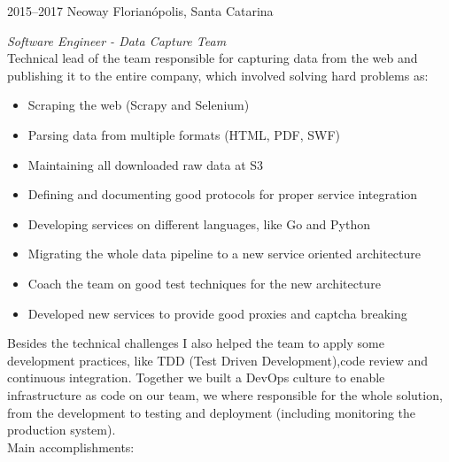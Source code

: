 \documentclass[]{friggeri-cv} %
\begin{document}
\begin{entrylist}
\entry
{2015--2017}
{Neoway}
{Florianópolis, Santa Catarina}
{\emph{Software Engineer - Data Capture Team} \\

    Technical lead of the team responsible for capturing data from the web and publishing it to the entire company,
which involved solving hard problems as:\\

\begin{itemize}
    \item Scraping the web (Scrapy and Selenium)
    \item Parsing data from multiple formats (HTML, PDF, SWF)
    \item Maintaining all downloaded raw data at S3
    \item Defining and documenting good protocols for proper service integration
    \item Developing services on different languages, like Go and Python
    \item Migrating the whole data pipeline to a new service oriented architecture
    \item Coach the team on good test techniques for the new architecture
    \item Developed new services to provide good proxies and captcha breaking
\end{itemize}

Besides the technical challenges I also helped the team to apply some
development practices, like TDD (Test Driven Development),code review
and continuous integration.
Together we built a DevOps culture to enable infrastructure as code
on our team, we where responsible for the whole solution, from the development
to testing and deployment (including monitoring the production system).\\

Main accomplishments:

}
\end{entrylist}
\end{document}
